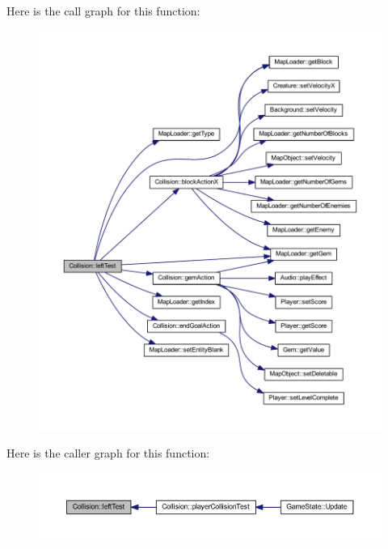 Here is the call graph for this function\+:
\nopagebreak
\begin{figure}[H]
\begin{center}
\leavevmode
\includegraphics[width=350pt]{class_collision_a0cd628e6adcb69e216f9b469fa7c029c_cgraph}
\end{center}
\end{figure}




Here is the caller graph for this function\+:
\nopagebreak
\begin{figure}[H]
\begin{center}
\leavevmode
\includegraphics[width=350pt]{class_collision_a0cd628e6adcb69e216f9b469fa7c029c_icgraph}
\end{center}
\end{figure}


